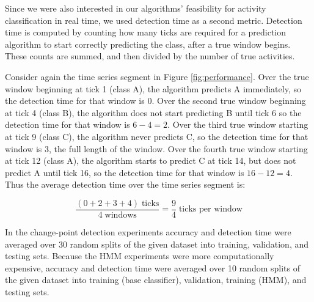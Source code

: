 Since we were also interested in our algorithms'
feasibility for activity classification in real time, we used detection time as
a second metric. Detection time is computed by counting how many ticks are
required for a prediction algorithm to start correctly predicting the class,
after a true window begins. These counts are summed, and then divided by the number of
true activities.

Consider again the time series segment in Figure \ref{fig:performance}.
Over the true window beginning at tick 1 (class A), the algorithm predicts A
immediately, so the detection time for that window is 0. Over the second true
window beginning at tick 4 (class B), the algorithm does not start predicting
B until tick 6 so the detection time for that window is $6-4=2$. Over the third
true window starting at tick 9 (class C),
the algorithm never predicts C, so the detection time for that window is 3, the
full length of the window. Over the fourth true window starting at tick 12 (class A), the
algorithm starts to predict C at tick 14, but does not predict A until tick 16,
so the detection time for that window is $16 - 12 = 4$. Thus the average
detection time over the time series segment is:

\[
\frac{(0 + 2 + 3 + 4) \; \text{ticks}}{4 \; \text{windows}} = \frac{9}{4} \; \text{ticks per window}
\]

In the change-point detection experiments accuracy and detection time were
averaged over 30 random splits of the given dataset into training, validation, and
testing sets. Because the HMM experiments were more computationally
expensive, accuracy and detection time were averaged over 10 random splits of
the given dataset into training (base classifier), validation, training (HMM),
and testing sets.
